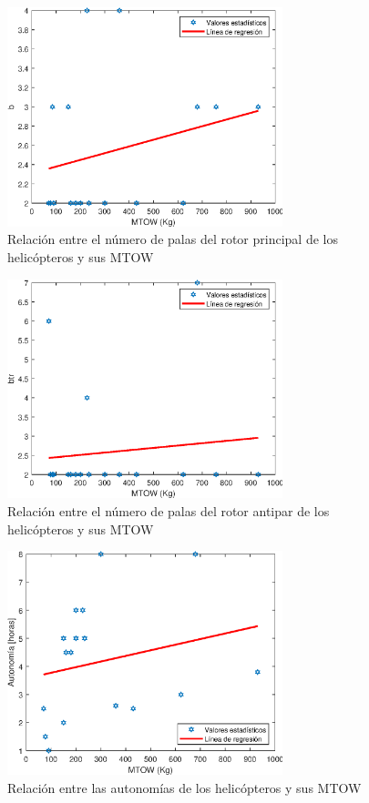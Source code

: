 \begin{figure}
	\centering
	\includegraphics[width=80mm]{graficos/analb}
	\caption{Relación entre el número de palas del rotor principal de los helicópteros y sus MTOW}
\end{figure}
\begin{figure}
	\centering
	\includegraphics[width=80mm]{graficos/analbtr}
	\caption{Relación entre el número de palas del rotor antipar de los helicópteros y sus MTOW}
\end{figure}
\begin{figure}
	\centering
	\includegraphics[width=80mm]{graficos/analaut}
	\caption{Relación entre las autonomías de los helicópteros y sus MTOW}
\end{figure}
